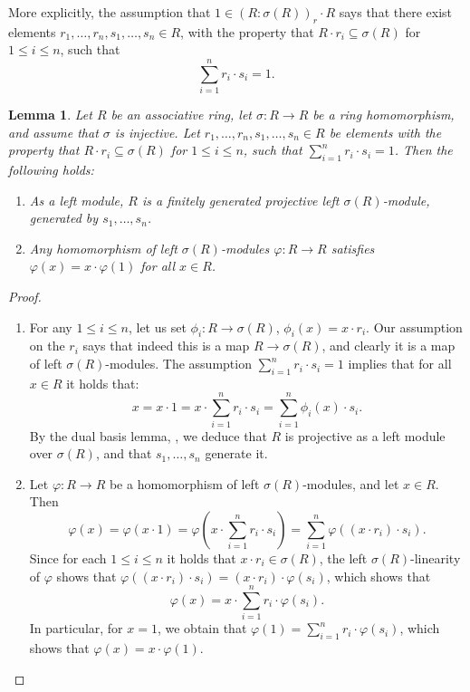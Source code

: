 \documentclass{amsart}
\newtheorem{lem}[equation]{Lemma}
\theoremstyle{definition}
\numberwithin{equation}{section}
\begin{document}
More explicitly, the assumption that 
$1 \in (R:\sigma(R))_r\cdot R$ says that there exist elements $r_1,\dots,r_n, s_1,\dots,s_n \in R$, with the property that $R\cdot r_i \subseteq \sigma(R)$ for $1 \le i \le n$,
such that 
\begin{equation}\label{eqn:risi}
\sum_{i=1}^n r_i \cdot s_i = 1.
\end{equation}

\begin{lem}\label{lem:fgProj}
Let $R$ be an associative ring,
let $\sigma:R \to R$ be a ring homomorphism,
and assume that $\sigma$ is injective.
Let $r_1,\dots,r_n, s_1,\dots,s_n \in R$ be elements with the property that
$R\cdot r_i \subseteq \sigma(R)$ for $1 \le i \le n$,
such that $\sum_{i=1}^n r_i \cdot s_i = 1$.
Then the following holds:
\begin{enumerate}
\item As a left module, $R$ is a finitely generated projective
left $\sigma(R)$-module, generated by $s_1,\dots,s_n$.
\item Any homomorphism of left $\sigma(R)$-modules $\varphi:R\to R$
satisfies $\varphi(x) = x\cdot \varphi(1)$ for all $x \in R$.
\end{enumerate}
\end{lem}
\begin{proof}\quad
\begin{enumerate}
\item For any $1 \le i \le n$,
let us set $\phi_i:R \to \sigma(R)$,
$\phi_i(x) = x\cdot r_i$.
Our assumption on the $r_i$ says that indeed this is a map $R \to \sigma(R)$, and clearly it is a map of left $\sigma(R)$-modules.
The assumption $\sum_{i=1}^n r_i \cdot s_i = 1$ implies that
for all $x \in R$ it holds that:
\[
x = x\cdot 1 = x\cdot \sum_{i=1}^n r_i \cdot s_i = 
\sum_{i=1}^n \phi_i(x)\cdot s_i.
\]
By the dual basis lemma, \cite[Lemma 3.5.2]{NCBook},
we deduce that $R$ is projective as a left module over $\sigma(R)$,
and that $s_1,\dots,s_n$ generate it.
\item Let $\varphi:R\to R$ be a homomorphism of left $\sigma(R)$-modules,
and let $x \in R$.
Then
\[
\varphi(x) = \varphi(x\cdot 1) = \varphi\left(x\cdot \sum_{i=1}^n r_i \cdot s_i\right) = \sum_{i=1}^n \varphi((x\cdot r_i) \cdot s_i).
\]
Since for each $1 \le i \le n$ it holds that $x\cdot r_i \in \sigma(R)$,
the left $\sigma(R)$-linearity of $\varphi$ shows that 
$\varphi((x\cdot r_i) \cdot s_i) = (x\cdot r_i) \cdot \varphi(s_i)$,
which shows that
\[
\varphi(x) = x \cdot \sum_{i=1}^n r_i \cdot \varphi(s_i).
\]
In particular, for $x=1$,
we obtain that $\varphi(1) = \sum_{i=1}^n r_i \cdot \varphi(s_i)$,
which shows that $\varphi(x) = x \cdot \varphi(1)$.
\end{enumerate}    
\end{proof}
\end{document}

